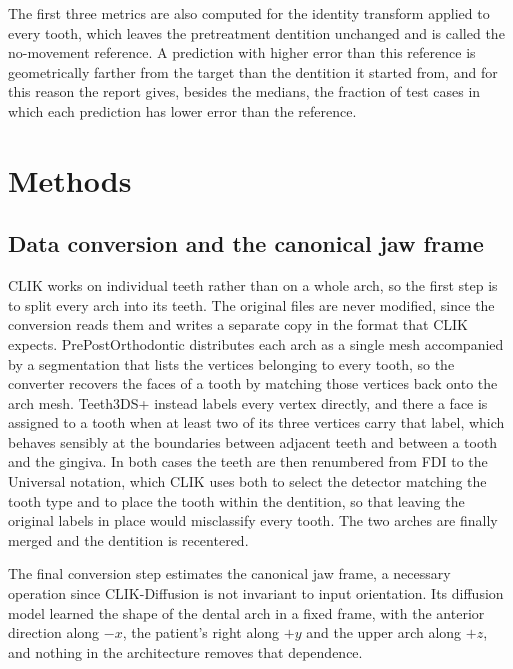 \documentclass[10pt,a4paper]{article}
\begin{document}
The first three metrics are also computed for the identity transform applied to every tooth, which leaves the pretreatment dentition unchanged and is called the no-movement reference. A prediction with higher error than this reference is geometrically farther from the target than the dentition it started from, and for this reason the report gives, besides the medians, the fraction of test cases in which each prediction has lower error than the reference.

\section{Methods}

\subsection{Data conversion and the canonical jaw frame}

CLIK works on individual teeth rather than on a whole arch, so the first step is to split every arch into its teeth. The original files are never modified, since the conversion reads them and writes a separate copy in the format that CLIK expects. PrePostOrthodontic distributes each arch as a single mesh accompanied by a segmentation that lists the vertices belonging to every tooth, so the converter recovers the faces of a tooth by matching those vertices back onto the arch mesh. Teeth3DS+ instead labels every vertex directly, and there a face is assigned to a tooth when at least two of its three vertices carry that label, which behaves sensibly at the boundaries between adjacent teeth and between a tooth and the gingiva. In both cases the teeth are then renumbered from FDI to the Universal notation, which CLIK uses both to select the detector matching the tooth type and to place the tooth within the dentition, so that leaving the original labels in place would misclassify every tooth. The two arches are finally merged and the dentition is recentered.

The final conversion step estimates the canonical jaw frame, a necessary operation since CLIK-Diffusion is not invariant to input orientation. Its diffusion model learned the shape of the dental arch in a fixed frame, with the anterior direction along $-x$, the patient's right along $+y$ and the upper arch along $+z$, and nothing in the architecture removes that dependence.
\end{document}
